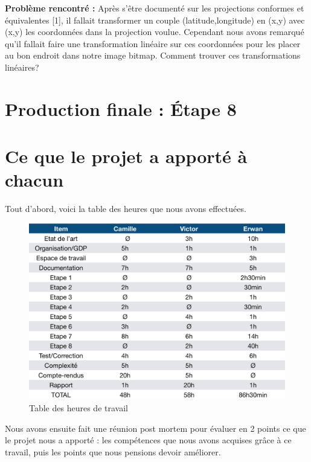 \documentclass{article}
\begin{document}
\textbf{Problème rencontré :} \newline
Après s'être documenté sur les projections conformes et équivalentes [1], il fallait transformer un couple (latitude,longitude) en (x,y) avec (x,y) les coordonnées dans la projection voulue. Cependant nous avons remarqué qu'il fallait faire une transformation linéaire sur ces coordonnées pour les placer au bon endroit dans notre image bitmap. Comment trouver ces transformations linéaires?

\vspace{1\baselineskip}




 \section{ Production finale : Étape 8}



\newpage

 \section{ Ce que le projet a apporté à chacun}

    Tout d'abord, voici la table des heures que nous avons effectuées.

\begin{figure}[H]
    \centering
    \includegraphics[scale=0.5]{TabledesHeures.png}
    \caption{Table des heures de travail}
    \label{fig:tableheures}
\end{figure}

    Nous avons ensuite fait une réunion post mortem pour évaluer en 2 points ce que le projet nous a apporté : les compétences que nous avons acquises grâce à ce travail, puis les points que nous pensions devoir améliorer.
    
\end{document}
